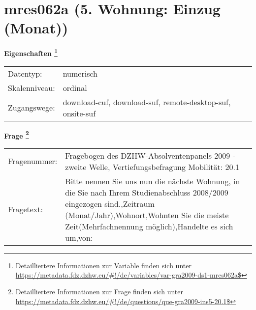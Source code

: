 
    \setcounter{footnote}{0}

    \vspace*{-1.8cm}
	\section{mres062a (5. Wohnung: Einzug (Monat))}
	\label{section:mres062a}



    \vspace*{0.5cm}
    \noindent\textbf{Eigenschaften
	\footnote{Detailliertere Informationen zur Variable finden sich unter
		\url{https://metadata.fdz.dzhw.eu/\#!/de/variables/var-gra2009-ds1-mres062a$}}}\\
	\begin{tabularx}{\hsize}{@{}lX}
	Datentyp: & numerisch \\
	Skalenniveau: & ordinal \\
	Zugangswege: &
	  download-cuf, 
	  download-suf, 
	  remote-desktop-suf, 
	  onsite-suf
 \\
    \end{tabularx}



				\vspace*{0.5cm}
                \noindent\textbf{Frage
	                \footnote{Detailliertere Informationen zur Frage finden sich unter
		              \url{https://metadata.fdz.dzhw.eu/\#!/de/questions/que-gra2009-ins5-20.1$}}}\\
				\begin{tabularx}{\hsize}{@{}lX}
					Fragenummer: &
					  Fragebogen des DZHW-Absolventenpanels 2009 - zweite Welle, Vertiefungsbefragung Mobilität:
					  20.1
 \\
					Fragetext: & Bitte nennen Sie uns nun die nächste Wohnung, in die Sie nach Ihrem Studienabschluss 2008/2009 eingezogen sind.,Zeitraum (Monat/Jahr),Wohnort,Wohnten Sie die meiste Zeit(Mehrfachnennung möglich),Handelte es sich um,von: \\
				\end{tabularx}





